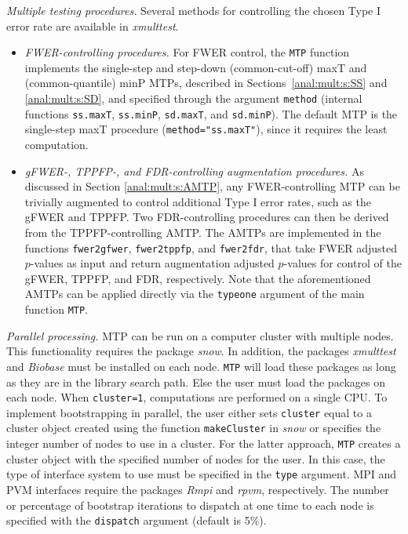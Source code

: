 \documentclass[11pt]{article}
\newcommand{\Rpackage}[1]{\textit{#1}}
\newcommand{\Robject}[1]{\texttt{#1}}
\begin{document}
\begin{description}
\item{\em Multiple testing procedures.} 
Several methods for controlling the chosen Type I error rate are available in \Rpackage{xmulttest}. 
\begin{itemize}
\item
{\em FWER-controlling procedures.}
For FWER control, the \Robject{MTP} function implements the single-step and step-down (common-cut-off) maxT and (common-quantile) minP MTPs, described in Sections~\ref{anal:mult:s:SS} and \ref{anal:mult:s:SD}, and specified through the argument \Robject{method} (internal functions \Robject{ss.maxT}, \Robject{ss.minP}, \Robject{sd.maxT}, and \Robject{sd.minP}).
The default MTP is the single-step maxT procedure (\Robject{method="ss.maxT"}), since it requires the least computation.
\item 
{\em gFWER-, TPPFP-, and FDR-controlling augmentation procedures.} 
As discussed in Section \ref{anal:mult:s:AMTP}, any FWER-controlling MTP can be trivially augmented to control additional Type I error rates, such as the gFWER and TPPFP.
Two FDR-controlling procedures can then be derived from the TPPFP-controlling AMTP.
The AMTPs are implemented in the functions \Robject{fwer2gfwer}, \Robject{fwer2tppfp}, and \Robject{fwer2fdr}, that take FWER adjusted $p$-values as input and return augmentation adjusted $p$-values for control of the gFWER, TPPFP, and FDR, respectively. 
Note that the aforementioned AMTPs can be applied directly via the \Robject{typeone} argument of the main function \Robject{MTP}.
\end{itemize}

\item{\em Parallel processing.}
MTP can be run on a computer cluster with multiple nodes. This functionality requires the package \Rpackage{snow}. In addition, the packages \Rpackage{xmulttest} and \Rpackage{Biobase} must be
installed on each node. \Robject{MTP} will load these packages as long as they are in the library
search path. Else the user must load the packages on each node. When \Robject{cluster=1}, computations are performed on a single CPU. To implement bootstrapping in parallel, the user either sets \Robject{cluster} equal to a cluster object created using the function \Robject{makeCluster} 
in \Rpackage{snow} or specifies the integer number of nodes to use in a cluster. For the latter 
approach, \Robject{MTP} creates a cluster object with the specified number of nodes for the user. 
In this case, the type of interface system to use must be specified in the \Robject{type} argument. 
MPI and PVM interfaces require the packages \Rpackage{Rmpi} and \Rpackage{rpvm}, respectively. The number or percentage of bootstrap iterations to dispatch at one time to each node is specified 
with the \Robject{dispatch} argument (default is 5\%).


\end{description}
\end{document}
